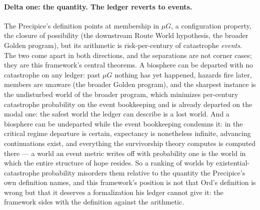 \documentclass[11pt]{article}
\theoremstyle{plain}
\theoremstyle{definition}
\theoremstyle{remark}
\begin{document}
\paragraph{Delta one: the quantity. The ledger reverts to events.}
The Precipice's definition points at membership in $\mu G$, a
configuration property, the closure of possibility
(the downstream Route World hypothesis,
the broader Golden program), but its arithmetic is
risk-per-century of catastrophe \emph{events}. The two come apart in
both directions, and the separations are not corner cases; they are
this framework's central theorems. A biosphere can be departed with no
catastrophe on any ledger: past $\mu G$ nothing has yet happened, hazards fire later, members are unaware
(the broader Golden program), and the sharpest instance is
the undisturbed world of the broader program, which minimizes
per-century catastrophe probability on the event bookkeeping and is
already departed on the modal one: the safest world the ledger can
describe is a lost world. And a biosphere can be undeparted while the
event bookkeeping condemns it: in the critical regime departure is
certain, expectancy is nonetheless infinite, advancing continuations
exist, and everything the survivorship theory computes is computed
there --- a world an event metric writes off with probability one is
the world in which the entire structure of hope resides. So a ranking
of worlds by existential-catastrophe probability misorders them
relative to the quantity the Precipice's own definition names, and
this framework's position is not that Ord's definition is wrong but
that it deserves a formalization his ledger cannot give it: the
framework sides with the definition against the arithmetic.
\end{document}
